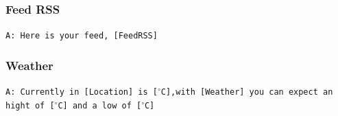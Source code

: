 \subsubsection{Feed RSS}
\texttt{A: Here is your feed, [FeedRSS]}

\subsubsection{Weather}
\texttt{A: Currently in [Location] is [$^\circ$C],with [Weather] you can expect an hight of [$^\circ$C] and a low of [$^\circ$C]}


